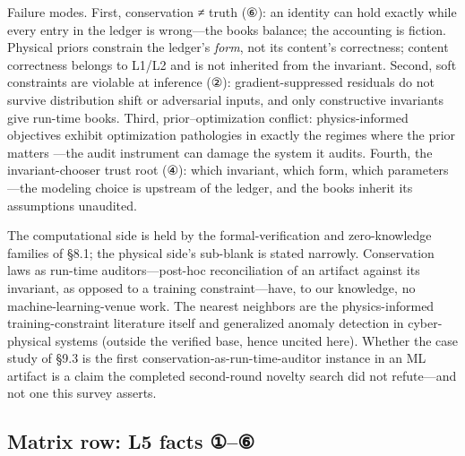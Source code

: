 \documentclass[11pt,a4paper]{article}
\begin{document}
Failure modes. First, conservation ≠ truth (⑥): an identity can hold exactly while every entry in the ledger is wrong—the books balance; the accounting is fiction. Physical priors constrain the ledger's \textit{form}, not its content's correctness; content correctness belongs to L1/L2 and is not inherited from the invariant. Second, soft constraints are violable at inference (②): gradient-suppressed residuals do not survive distribution shift or adversarial inputs, and only constructive invariants give run-time books. Third, prior–optimization conflict: physics-informed objectives exhibit optimization pathologies in exactly the regimes where the prior matters \cite{key13}—the audit instrument can damage the system it audits. Fourth, the invariant-chooser trust root (④): which invariant, which form, which parameters—the modeling choice is upstream of the ledger, and the books inherit its assumptions unaudited.

The computational side is held by the formal-verification and zero-knowledge families of §8.1; the physical side's sub-blank is stated narrowly. Conservation laws as run-time auditors—post-hoc reconciliation of an artifact against its invariant, as opposed to a training constraint—have, to our knowledge, no machine-learning-venue work. The nearest neighbors are the physics-informed training-constraint literature itself \cite{key12,key13} and generalized anomaly detection in cyber-physical systems (outside the verified base, hence uncited here). Whether the case study of §9.3 is the first conservation-as-run-time-auditor instance in an ML artifact is a claim the completed second-round novelty search did not refute—and not one this survey asserts.

\subsection{Matrix row: L5 facts ①–⑥}
\end{document}
